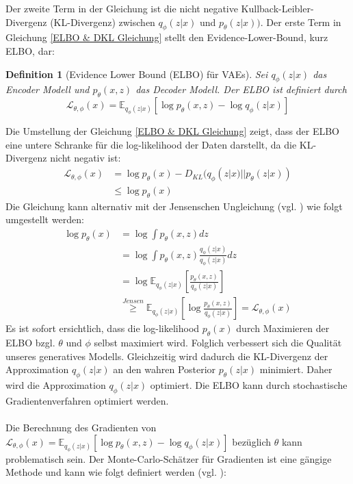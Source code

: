 \documentclass[%
thesis=student,%
coverpage=false,%
titlepage=false,%
headmarks=true, %
german,%
font=libertine, %
math=newpxtx, %
BCOR=5mm,%
coverBCOR=11mm%
]{tumbook}
\theoremstyle{break}
\newtheorem{definition}{Definition}[section]
\begin{document}
Der zweite Term in der Gleichung ist die nicht negative Kullback-Leibler-Divergenz (KL-Divergenz) zwischen $q_\phi(z|x)$ und $p_\theta(z|x))$. Der erste Term in Gleichung \ref{ELBO & DKL Gleichung} stellt den Evidence-Lower-Bound, kurz ELBO, dar: 
\begin{definition}[Evidence Lower Bound (ELBO) für VAEs]
	Sei $q_\phi(z|x)$ das Encoder Modell und $p_\theta(x,z)$ das Decoder Modell. Der ELBO ist definiert durch
	$$ \mathcal{L}_{\theta,\phi}(x) = \mathbb{E}_{q_\phi(z|x)}[\log p_\theta(x,z) - \log q_\phi(z|x)] $$ 
\end{definition}\noindent
Die Umstellung der Gleichung \ref{ELBO & DKL Gleichung} zeigt, dass der ELBO eine untere Schranke für die log-likelihood der Daten darstellt, da die KL-Divergenz nicht negativ ist: 
\begin{align}
	\mathcal{L}_{\theta,\phi}(x) &= \log p_\theta(x) - D_{KL}(q_\phi(z|x)||p_\theta(z|x)) \\
	&\leq 	\log p_\theta(x) 
\end{align}\noindent
Die Gleichung kann alternativ mit der Jensenschen Ungleichung (vgl. \cite{JensenscheUngleichung}) wie folgt umgestellt werden:
\begin{align}
	\log p_\theta(x) &= \log \int p_\theta(x,z) dz \\
	&= \log \int p_\theta(x,z) \frac{q_\phi(z|x)}{q_\phi(z|x)} dz \\
	& = \log \mathbb{E}_{q_\phi(z|x)}\left[\frac{p_\theta(x,z)}{q_\phi(z|x)}\right] \\
	& \overset{Jensen}{\geq} \mathbb{E}_{q_\phi(z|x)}\left[\log \frac{p_\theta(x,z)}{q_\phi(z|x)}\right] = \mathcal{L}_{\theta,\phi}(x)
\end{align}\noindent
Es ist sofort ersichtlich, dass die log-likelihood $p_\theta(x)$ durch Maximieren der ELBO bzgl. $\theta$ und  $\phi$ selbst maximiert wird.
Folglich verbessert sich die Qualität unseres generatives Modells. Gleichzeitig wird  dadurch die KL-Divergenz der Approximation $q_\phi(z|x)$ an den wahren Posterior $p_\theta(z|x)$ minimiert. Daher wird die Approximation $q_\phi(z|x)$ optimiert. 
Die ELBO kann durch stochastische Gradientenverfahren optimiert werden.\\
\\
Die Berechnung des Gradienten von $\mathcal{L}_{\theta,\phi}(x) = \mathbb{E}_{q_\phi(z|x)}\left[\log p_\theta(x,z)- \log q_\phi(z|x)\right]$ bezüglich $\theta$ kann problematisch sein. Der Monte-Carlo-Schätzer für Gradienten ist eine gängige Methode und kann wie folgt definiert werden (vgl. \cite{MonteCarloEstimation}): 
\end{document}
